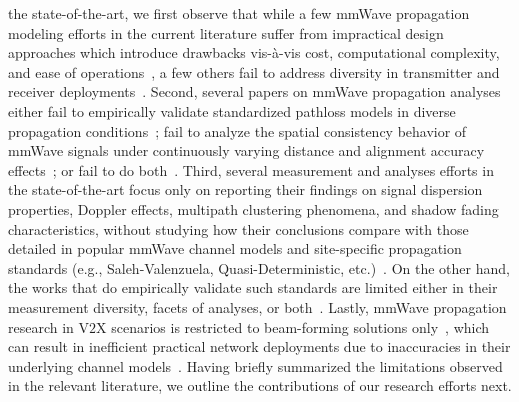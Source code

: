 \documentclass[10pt, twocolumn]{IEEEtran}
\begin{document}
 the state-of-the-art, we first observe that while a few mmWave propagation modeling efforts in the current literature suffer from impractical design approaches which introduce drawbacks vis-\`{a}-vis cost, computational complexity, and ease of operations~\cite{Purdue, Foliage, AgileLink}, a few others fail to address diversity in transmitter and receiver deployments~\cite{Harvard, Indoor60G, MacCartneyRural}. Second, several papers on mmWave propagation analyses either fail to empirically validate standardized pathloss models in diverse propagation conditions~\cite{SpatialConsistencyOriginal, MolischSpatialOutdoor, MacCartneySpatialStatistics}; fail to analyze the spatial consistency behavior of mmWave signals under continuously varying distance and alignment accuracy effects~\cite{Outdoor28G, Qualcomm3GPP, MacCartneyModelsOverview}; or fail to do both~\cite{Indoor60G, SuburbanGeometryJournal, FoliageSimulations}. Third, several measurement and analyses efforts in the state-of-the-art focus only on reporting their findings on signal dispersion properties, Doppler effects, multipath clustering phenomena, and shadow fading characteristics, without studying how their conclusions compare with those detailed in popular mmWave channel models and site-specific propagation standards (e.g., Saleh-Valenzuela, Quasi-Deterministic, etc.)~\cite{PDAPs, DopplerHST, Outdoor28G, SpatialDynamics, V2XBlockages}. On the other hand, the works that do empirically validate such standards are limited either in their measurement diversity, facets of analyses, or both~\cite{Indoor60G, NISTModeling, QDC_NIST, D2DHumanBlockage}. Lastly, mmWave propagation research in V$2$X scenarios is restricted to beam-forming solutions only~\cite{VehicularBeamSelection, CVBeamAlignmentV2X}, which can result in inefficient practical network deployments due to inaccuracies in their underlying channel models~\cite{MolischEstimate, IoV}. Having briefly summarized the limitations observed in the relevant literature, we outline the contributions of our research efforts next.\\
\end{document}
